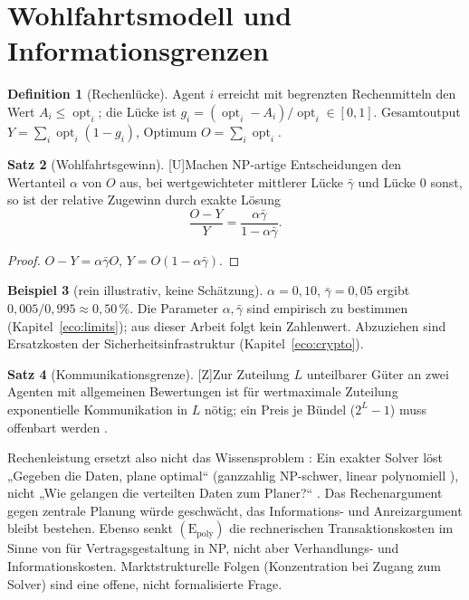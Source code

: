 \documentclass[a4paper,12pt]{article}
\theoremstyle{definition}
\newtheorem{definition}{Definition}[section]
\newtheorem{satz}[definition]{Satz}
\newtheorem{beispiel}[definition]{Beispiel}
\newcommand{\tU}{\textsf{\small[U]}}   %
\newcommand{\tZ}{\textsf{\small[Z]}}   %
\newcommand{\Epoly}{(\mathrm{E}_{\mathrm{poly}})}
\newcommand{\opt}{\operatorname{opt}}
\begin{document}
\section{Wohlfahrtsmodell und Informationsgrenzen}
\label{eco:welfare}

\begin{definition}[Rechenlücke]
Agent \(i\) erreicht mit begrenzten Rechenmitteln den Wert \(A_i\le\opt_i\); die Lücke ist \(g_i=(\opt_i-A_i)/\opt_i\in[0,1]\). Gesamtoutput \(Y=\sum_i\opt_i(1-g_i)\), Optimum \(O=\sum_i\opt_i\).
\end{definition}
\begin{satz}[Wohlfahrtsgewinn]\tU\label{satz:gain}
Machen NP-artige Entscheidungen den Wertanteil \(\alpha\) von \(O\) aus, bei wertgewichteter mittlerer Lücke \(\bar\gamma\) und Lücke 0 sonst, so ist der relative Zugewinn durch exakte Lösung
\[
\frac{O-Y}{Y}=\frac{\alpha\bar\gamma}{1-\alpha\bar\gamma}.
\]
\end{satz}
\begin{proof}
\(O-Y=\alpha\bar\gamma O\), \(Y=O(1-\alpha\bar\gamma)\).
\end{proof}
\begin{beispiel}[rein illustrativ, keine Schätzung]
\(\alpha=0{,}10\), \(\bar\gamma=0{,}05\) ergibt \(0{,}005/0{,}995\approx0{,}50\,\%\). Die Parameter \(\alpha,\bar\gamma\) sind empirisch zu bestimmen (Kapitel~\ref{eco:limits}); aus dieser Arbeit folgt kein Zahlenwert. Abzuziehen sind Ersatzkosten der Sicherheitsinfrastruktur (Kapitel~\ref{eco:crypto}).
\end{beispiel}

\begin{satz}[Kommunikationsgrenze]\tZ\label{satz:comm}
Zur Zuteilung \(L\) unteilbarer Güter an zwei Agenten mit allgemeinen Bewertungen ist für wertmaximale Zuteilung exponentielle Kommunikation in \(L\) nötig; ein Preis je Bündel (\(2^L-1\)) muss offenbart werden \cite{nisansegal2006}.
\end{satz}
Rechenleistung ersetzt also nicht das Wissensproblem \cite{hayek1945}: Ein exakter Solver löst „Gegeben die Daten, plane optimal“ (ganzzahlig NP-schwer, linear polynomiell \cite{khachiyan1979}), nicht „Wie gelangen die verteilten Daten zum Planer?“ \cite{mises1920,hurwicz1972}. Das Rechenargument gegen zentrale Planung würde geschwächt, das Informations- und Anreizargument bleibt bestehen. Ebenso senkt \(\Epoly\) die rechnerischen Transaktionskosten im Sinne von \cite{coase1937} für Vertragsgestaltung in NP, nicht aber Verhandlungs- und Informationskosten. Marktstrukturelle Folgen (Konzentration bei Zugang zum Solver) sind eine offene, nicht formalisierte Frage.
\end{document}

